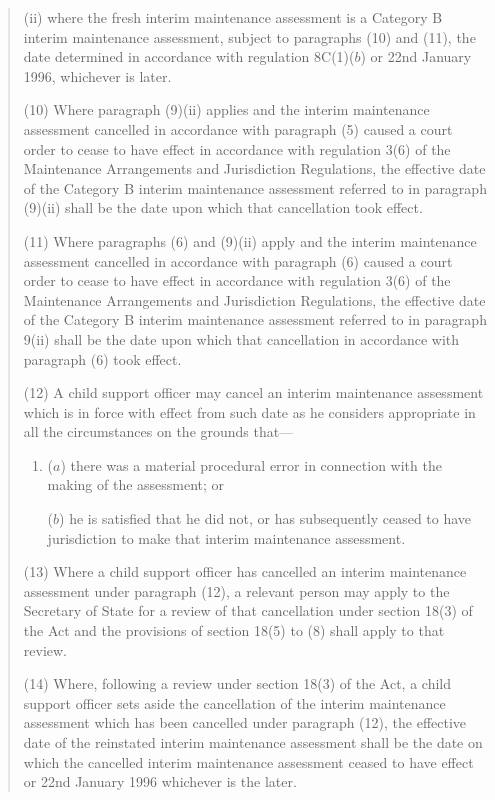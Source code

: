 \documentclass[12pt,a4paper]{article}
\begin{document}
\begin{quotation}
\begin{enumerate}
(ii) where the fresh interim maintenance assessment is a Category B interim maintenance assessment, subject to paragraphs (10) and (11), the date determined in accordance with regulation 8C(1)($b$) or 22nd January 1996, whichever is later.
\end{enumerate}

(10) Where paragraph (9)(ii) applies and the interim maintenance assessment cancelled in accordance with paragraph (5) caused a court order to cease to have effect in accordance with regulation 3(6) of the Maintenance Arrangements and Jurisdiction Regulations, the effective date of the Category B interim maintenance assessment referred to in paragraph (9)(ii) shall be the date upon which that cancellation took effect.

(11) Where paragraphs (6) and (9)(ii) apply and the interim maintenance assessment cancelled in accordance with paragraph (6) caused a court order to cease to have effect in accordance with regulation 3(6) of the Maintenance Arrangements and Jurisdiction Regulations, the effective date of the Category B interim maintenance assessment referred to in paragraph 9(ii) shall be the date upon which that cancellation in accordance with paragraph (6) took effect.

(12) A child support officer may cancel an interim maintenance assessment which is in force with effect from such date as he considers appropriate in all the circumstances on the grounds that—
\begin{enumerate}\item[]
($a$) there was a material procedural error in connection with the making of the assessment; or

($b$) he is satisfied that he did not, or has subsequently ceased to have jurisdiction to make that interim maintenance assessment.
\end{enumerate}

(13) Where a child support officer has cancelled an interim maintenance assessment under paragraph (12), a relevant person may apply to the Secretary of State for a review of that cancellation under section 18(3) of the Act and the provisions of section 18(5) to (8) shall apply to that review.

(14) Where, following a review under section 18(3) of the Act, a child support officer sets aside the cancellation of the interim maintenance assessment which has been cancelled under paragraph (12), the effective date of the reinstated interim maintenance assessment shall be the date on which the cancelled interim maintenance assessment ceased to have effect or 22nd January 1996 whichever is the later.


\end{quotation}
\end{document}

